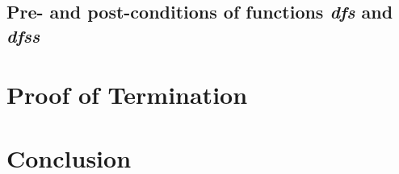 \documentclass[sigplan,10pt,anonymous,review]{acmart}
\newcommand{\prog}[1]{\textit{#1}}
\begin{document}
\subsection{Pre- and post-conditions of functions \prog{dfs} and \prog{dfss}}
\label{sec:pre-post}



\section{Proof of Termination}
\label{sec:termination}


\section{Conclusion}
\label{sec:conclusion}




\end{document}
